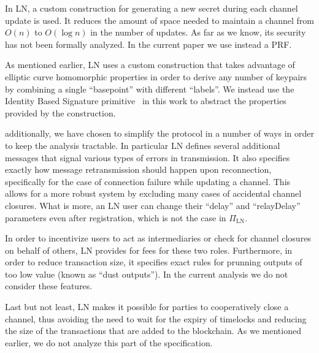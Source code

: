   \begin{remark}

    In LN, a custom construction for generating a new secret during each channel
    update is used. It reduces the amount of space needed to maintain a channel
    from $O(n)$ to $O(\log n)$ in the number of updates. As far as we know, its
    security has not been formally analyzed. In the current paper we use instead
    a PRF.

    As mentioned earlier, LN uses a custom construction that takes advantage of
    elliptic curve homomorphic properties in order to derive any number of
    keypairs by combining a single ``basepoint'' with different ``labels''. We
    instead use the Identity Based Signature
    primitive~\cite{ibsshamir,ibspaterson} in this work to abstract the
    properties provided by the construction.

    additionally, we have chosen to simplify the protocol in a number of ways in
    order to keep the analysis tractable. In particular LN defines several
    additional messages that signal various types of errors in transmission. It
    also specifies exactly how message retransmission should happen upon
    reconnection, specifically for the case of connection failure while updating
    a channel. This allows for a more robust system by excluding many cases of
    accidental channel closures. What is more, an LN user can change their
    ``delay'' and ``relayDelay'' parameters even after registration, which is
    not the case in $\Pi_{\mathrm{LN}}$.

    In order to incentivize users to act as intermediaries or check for channel
    closures on behalf of others, LN provides for fees for these two roles.
    Furthermore, in order to reduce transaction size, it specifies exact rules
    for prunning outputs of too low value (known as ``dust outputs''). In the
    current analysis we do not consider these features.

    Last but not least, LN makes it possible for parties to cooperatively close
    a channel, thus avoiding the need to wait for the expiry of timelocks and
    reducing the size of the transactions that are added to the blockchain. As
    we mentioned earlier, we do not analyze this part of the specification.
  \end{remark}
